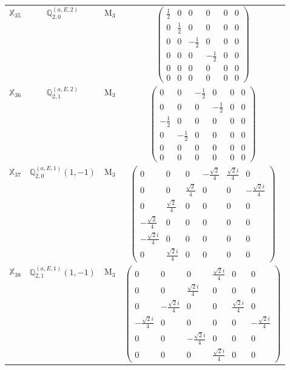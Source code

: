 \documentclass[fleqn,10pt,landscape]{article}
\begin{document}
\begin{itemize}
\begin{center}
\begin{longtable}{c|c|c|c}
$ \mathbb{X}_{35} $ & $\mathbb{Q}_{2,0}^{(a,E,2)}$ & M$_{3}$ & $\begin{pmatrix} \frac{1}{2} & 0 & 0 & 0 & 0 & 0 \\ 0 & \frac{1}{2} & 0 & 0 & 0 & 0 \\ 0 & 0 & - \frac{1}{2} & 0 & 0 & 0 \\ 0 & 0 & 0 & - \frac{1}{2} & 0 & 0 \\ 0 & 0 & 0 & 0 & 0 & 0 \\ 0 & 0 & 0 & 0 & 0 & 0 \end{pmatrix}$ \\
$ \mathbb{X}_{36} $ & $\mathbb{Q}_{2,1}^{(a,E,2)}$ & M$_{3}$ & $\begin{pmatrix} 0 & 0 & - \frac{1}{2} & 0 & 0 & 0 \\ 0 & 0 & 0 & - \frac{1}{2} & 0 & 0 \\ - \frac{1}{2} & 0 & 0 & 0 & 0 & 0 \\ 0 & - \frac{1}{2} & 0 & 0 & 0 & 0 \\ 0 & 0 & 0 & 0 & 0 & 0 \\ 0 & 0 & 0 & 0 & 0 & 0 \end{pmatrix}$ \\
$ \mathbb{X}_{37} $ & $\mathbb{Q}_{2,0}^{(a,E,1)}(1,-1)$ & M$_{3}$ & $\begin{pmatrix} 0 & 0 & 0 & - \frac{\sqrt{2}}{4} & \frac{\sqrt{2} i}{4} & 0 \\ 0 & 0 & \frac{\sqrt{2}}{4} & 0 & 0 & - \frac{\sqrt{2} i}{4} \\ 0 & \frac{\sqrt{2}}{4} & 0 & 0 & 0 & 0 \\ - \frac{\sqrt{2}}{4} & 0 & 0 & 0 & 0 & 0 \\ - \frac{\sqrt{2} i}{4} & 0 & 0 & 0 & 0 & 0 \\ 0 & \frac{\sqrt{2} i}{4} & 0 & 0 & 0 & 0 \end{pmatrix}$ \\
$ \mathbb{X}_{38} $ & $\mathbb{Q}_{2,1}^{(a,E,1)}(1,-1)$ & M$_{3}$ & $\begin{pmatrix} 0 & 0 & 0 & \frac{\sqrt{2} i}{4} & 0 & 0 \\ 0 & 0 & \frac{\sqrt{2} i}{4} & 0 & 0 & 0 \\ 0 & - \frac{\sqrt{2} i}{4} & 0 & 0 & \frac{\sqrt{2} i}{4} & 0 \\ - \frac{\sqrt{2} i}{4} & 0 & 0 & 0 & 0 & - \frac{\sqrt{2} i}{4} \\ 0 & 0 & - \frac{\sqrt{2} i}{4} & 0 & 0 & 0 \\ 0 & 0 & 0 & \frac{\sqrt{2} i}{4} & 0 & 0 \end{pmatrix}$ \\

\end{longtable}
\end{center}
\end{itemize}
\end{document}
